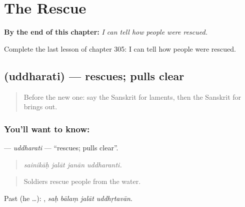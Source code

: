 
\chapter{The Rescue}
\label{ch:sa-the-rescue}

\begin{chapteropening}
\textbf{By the end of this chapter:} \emph{I can tell how people were rescued.}

Complete the last lesson of chapter 305: I can tell how people were rescued.
\end{chapteropening}

\section[\texorpdfstring{\sk{उद्धरति} (uddharati)}{उद्धरति (uddharati)}]{ (uddharati) — rescues; pulls clear}

\label{lesson:SA-C305-uddharati}



\begin{quote}
Before the new one: say the Sanskrit for laments, then the Sanskrit for brings out.
\end{quote}

\subsection*{You'll want to know: }
\textbf{} — \emph{uddharati} — \textquotedblleft{}rescues; pulls clear\textquotedblright{}.

\begin{quote}
   
\end{quote}

\begin{quote}
\emph{sainikāḥ jalāt janān uddharanti.}
\end{quote}

\begin{quote}
Soldiers rescue people from the water.
\end{quote}

Past (he …):    , \emph{saḥ bālaṃ jalāt uddhṛtavān}.

